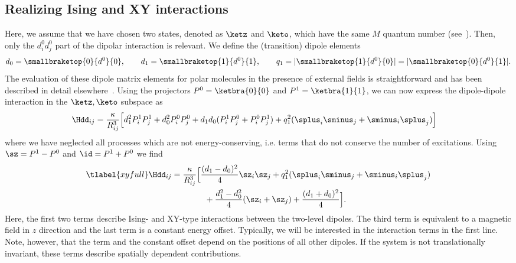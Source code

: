 \subsection{Realizing Ising and XY interactions}
Here, we assume that we have chosen two states, denoted as $\ketz$ and $\keto$, which have the
same $M$ quantum number (see~).
Then, only the $d^0_id^0_j$ part of the dipolar interaction is relevant.
We define the (transition) dipole elements
\begin{align}
    d_0 = \smallbraketop{0}{d^0}{0},\qquad
    d_1 = \smallbraketop{1}{d^0}{1},\qquad
    q_1 = |\smallbraketop{1}{d^0}{0}| = |\smallbraketop{0}{d^0}{1}|.
\end{align}
The evaluation of these dipole matrix elements for polar molecules in the presence of external fields is straightforward and has been described in detail elsewhere~\cite{Micheli2007}.
Using the projectors $P^0 = \ketbra{0}{0}$ and $P^1 = \ketbra{1}{1}$, we can now express the
dipole-dipole interaction  in the $\ketz, \keto$ subspace as
\begin{align}
    \Hdd_{ij} &= \frac{\kappa}{R_{ij}^3} \Big[ d_1^2 P^1_i P^1_j + d_0^2 P^0_i P^0_j + d_1d_0 (P^1_i P^0_j + P^0_i P^1_j)
              + q_1^2 (\splus_i \sminus_j + \sminus_i \splus_j) \Big]
\end{align}
where we have neglected all processes which are not energy-conserving,
i.e. terms that do not conserve the number of excitations.
Using $\sz = P^1 - P^0$ and $\id = P^1 + P^0$ we find
\begin{align} \tlabel{xyfull}
    \Hdd_{ij} &= \frac{\kappa}{R_{ij}^3} \Big[ \frac{(d_1-d_0)^2}{4} \sz_i \sz_j  + q_1^2 (\splus_i \sminus_j + \sminus_i \splus_j)\\
              &\qquad\qquad + \frac{d_1^2 - d_0^2}{4} (\sz_i + \sz_j)  + \frac{(d_1+d_0)^2}{4} \Big].
\end{align}
Here, the first two terms describe Ising- and XY-type interactions between the two-level dipoles. The third term is equivalent to a magnetic field in $z$ direction and the last term is a constant energy offset. Typically, we will be interested in the interaction terms in the first line. Note, however, that the  term and the constant offset depend on the positions of all other dipoles. If the system is not translationally invariant, these terms
describe spatially dependent contributions.

